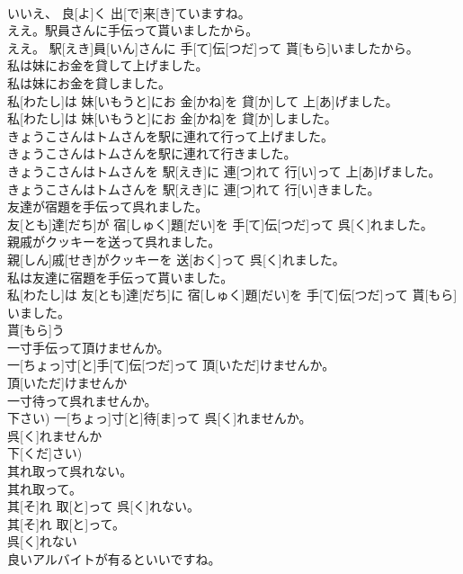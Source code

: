 \documentclass[8pt]{extreport}
\begin{document}
\begin{CJK}{UTF8}{min}
\\	いいえ、 良[よ]く 出[で]来[き]ていますね。
\\	ええ。駅員さんに手伝って貰いましたから。	
\\	ええ。 駅[えき]員[いん]さんに 手[て]伝[つだ]って 貰[もら]いましたから。
\\	私は妹にお金を貸して上げました。 
\\	私は妹にお金を貸しました。	
\\	私[わたし]は 妹[いもうと]にお 金[かね]を 貸[か]して 上[あ]げました。 
\\	私[わたし]は 妹[いもうと]にお 金[かね]を 貸[か]しました。
\\	きょうこさんはトムさんを駅に連れて行って上げました。 
\\	きょうこさんはトムさんを駅に連れて行きました。	
\\	きょうこさんはトムさんを 駅[えき]に 連[つ]れて 行[い]って 上[あ]げました。 
\\	きょうこさんはトムさんを 駅[えき]に 連[つ]れて 行[い]きました。
\\	友達が宿題を手伝って呉れました。	
\\	友[とも]達[だち]が 宿[しゅく]題[だい]を 手[て]伝[つだ]って 呉[く]れました。
\\	親戚がクッキーを送って呉れました。	
\\	親[しん]戚[せき]がクッキーを 送[おく]って 呉[く]れました。
\\	私は友達に宿題を手伝って貰いました。	
\\	私[わたし]は 友[とも]達[だち]に 宿[しゅく]題[だい]を 手[て]伝[つだ]って 貰[もら]いました。 
\\	貰[もら]う 
\\	一寸手伝って頂けませんか。	
\\	一[ちょっ]寸[と]手[て]伝[つだ]って 頂[いただ]けませんか。 
\\	頂[いただ]けませんか 
\\	一寸待って呉れませんか。	
\\	下さい)	一[ちょっ]寸[と]待[ま]って 呉[く]れませんか。 
\\	呉[く]れませんか 
\\	下[くだ]さい)
\\	其れ取って呉れない。 
\\	其れ取って。	
\\	其[そ]れ 取[と]って 呉[く]れない。 
\\	其[そ]れ 取[と]って。 
\\	呉[く]れない 
\\	良いアルバイトが有るといいですね。	

\end{CJK}
\end{document}
